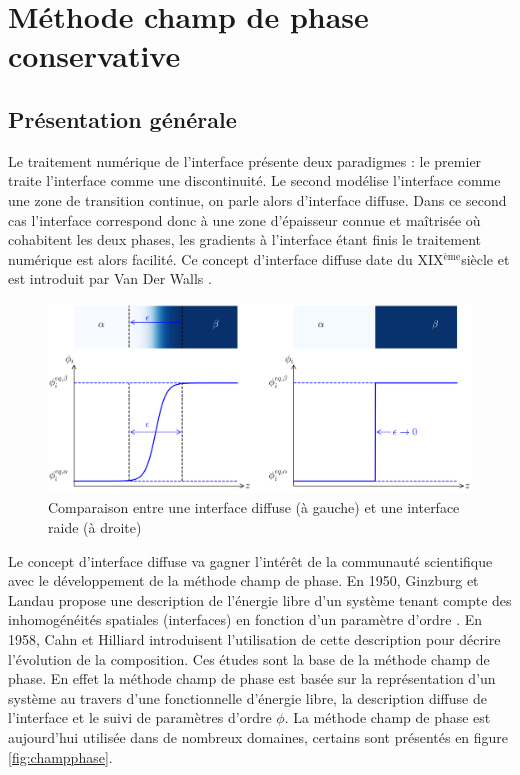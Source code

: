 \section{Méthode champ de phase conservative}
\subsection{Présentation générale}
Le traitement numérique de l'interface présente deux paradigmes : le premier traite l'interface comme une discontinuité. Le second modélise l'interface comme une zone de transition continue, on parle alors d'interface diffuse.
Dans ce second cas l'interface correspond donc à une zone d'épaisseur connue et maîtrisée où cohabitent les deux phases, les gradients à l'interface étant finis le traitement numérique est alors facilité. Ce concept d'interface diffuse date du XIX$^{\text{ème}}$siècle et est introduit par Van Der Walls \cite{rowlinson_translation_1979}.
\begin{figure}[H]
	\centering
	\includegraphics[width=0.5\linewidth]{figure/diffuse_interface}
	\caption{Comparaison entre une interface diffuse (à gauche) et une interface raide (à droite)}
	\label{fig:diffuseinterface}
\end{figure} 
 Le concept d'interface diffuse va gagner l'intérêt de la communauté scientifique avec le développement de la méthode champ de phase. En 1950, Ginzburg et Landau propose une description de l'énergie libre d'un système tenant compte des inhomogénéités spatiales (interfaces) en fonction d'un paramètre d'ordre \cite{landau_physique_1995}. En 1958, Cahn et Hilliard \cite{cahn_free_1958}  introduisent l'utilisation de cette description pour décrire l'évolution de la composition. Ces études sont la base de la méthode champ de phase. En effet la méthode champ de phase est basée sur la représentation d'un système au travers d'une fonctionnelle d'énergie libre, la description diffuse de l'interface et le suivi de paramètres d'ordre $\phi$. La méthode champ de phase est aujourd'hui utilisée dans de nombreux domaines, certains sont présentés en figure \ref{fig:champphase}.
